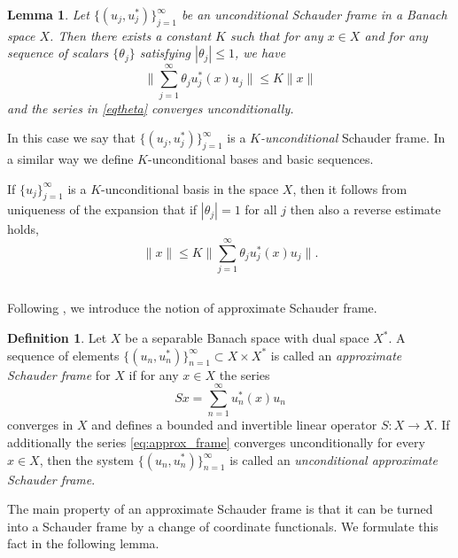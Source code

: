 \documentclass[reqno,a4paper,12pt]{amsart}
\numberwithin{equation}{section}
\numberwithin{figure}{section}
\newcommand\1{\mathds{1}}
\renewcommand\le{\leqslant}
\renewcommand\leq{\leqslant}
\theoremstyle{plain}
\newtheorem{lemma}[thm]{Lemma}
\theoremstyle{definition}
\newtheorem{definition}[thm]{Definition}
\begin{document}
\begin{lemma}
\label{lem:unc_constant}
Let $\{(u_j, u_j^*)\}_{j=1}^\infty$ be an unconditional Schauder frame in 
a Banach space $X$.  Then there exists a constant $K$ such that for any 
$x\in X$ and for any
sequence of scalars $\{\theta_j\}$ satisfying  $|\theta_j|\le 1$, we have
\begin{equation}
\label{eqtheta}
\Big\| \sum_{j=1}^\infty \theta_j u_j^*(x) u_j \Big\| \leq K \|x\|
\end{equation}
and the series in \eqref{eqtheta} converges unconditionally.
\end{lemma}

In this case we say that  
$\{(u_j, u_j^*)\}_{j=1}^\infty$ 
is a \emph{$K$-unconditional} Schauder frame. In a similar way we define $K$-unconditional bases and basic sequences.

If $\{u_j\}_{j=1}^\infty$ is a $K$-unconditional basis in the space $X$, then it follows from uniqueness of the expansion that if $|\theta_j| = 1$ for all $j$ then also a reverse estimate holds,
\begin{equation}
\|x\|\le K \Big\| \sum_{j=1}^\infty \theta_j u_j^*(x) u_j \Big\|.
\end{equation}

\subsection{}
Following \cite{FOSZ14}, we introduce the notion of approximate Schauder frame.

\begin{definition}
Let $X$ be a separable Banach space with dual space $X^*$. 
A sequence of elements $\{(u_n, u_n^*)\}_{n=1}^\infty \subset X\times X^*$ is called an \emph{approximate Schauder frame} for $X$ if for any $x\in X$ the series
\begin{equation}\label{eq:approx_frame}
Sx = \sum_{n=1}^\infty u_n^*(x) u_n
\end{equation}
converges in $X$ and defines a bounded and invertible linear operator $S: X \to X$. If additionally the series \eqref{eq:approx_frame} converges unconditionally for every $x\in X$, then the system 
$\{(u_n, u_n^*)\}_{n=1}^\infty$ is called an \emph{unconditional approximate Schauder frame}.
\end{definition} 

The main property of an approximate Schauder frame is that it can be turned into a Schauder frame by a change of coordinate functionals. We formulate this fact in the following lemma.
\end{document}
